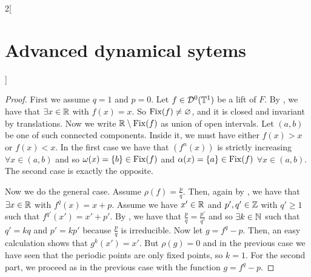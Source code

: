 \documentclass[../../../main_math.tex]{subfiles}
\begin{document}
\begin{multicols}{2}[\section{Advanced dynamical sytems}]
\begin{theorem}
  \end{theorem}
  \begin{proof}
    First we assume $q=1$ and $p=0$. Let $f\in \mathcal{D}^0(\mathbb{T}^1)$ be a lift of $F$. By , we have that $\exists x\in \mathbb{R}$ with $f(x)=x$. So $\mathrm{Fix}(f)\ne \varnothing$, and it is closed and invariant by translations. Now we write $\mathbb{R}\setminus\mathrm{Fix}(f)$ as union of open intervals. Let $(a,b)$ be one of such connected components. Inside it, we must have either $f(x)>x$ or $f(x)<x$. In the first case we have that $(f^n(x))$ is strictly increasing $\forall x\in (a,b)$ and so $\omega(x)=\{b\}\in\mathrm{Fix}(f)$ and $\alpha(x)=\{a\}\in\mathrm{Fix}(f)$ $\forall x\in(a,b)$. The second case is exactly the opposite.

    Now we do the general case. Assume $\rho(f)=\frac{p}{q}$. Then, again by , we have that $\exists x\in \mathbb{R}$ with $f^q(x)=x+p$. Assume we have $x'\in\mathbb{R}$ and $p',q'\in\mathbb{Z}$ with $q'\geq 1$ such that $f^{q'}(x')=x'+p'$. By , we have that $\frac{p}{q}=\frac{p'}{q'}$ and so $\exists k\in\mathbb{N}$ such that $q'=kq$ and $p'=kp'$ because $\frac{p}{q}$ is irreducible. Now let $g=f^q-p$. Then, an easy calculation shows that $g^k(x')=x'$. But $\rho(g)=0$ and in the previous case we have seen that the periodic points are only fixed points, so $k=1$. For the second part, we proceed as in the previous case with the function $g=f^q-p$.
  \end{proof}

\end{multicols}
\end{document}
